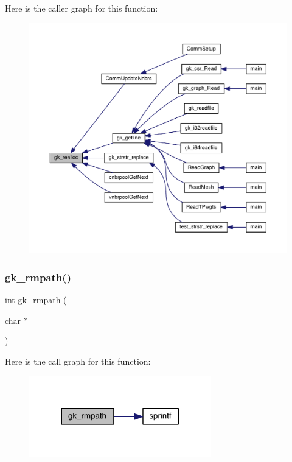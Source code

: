 Here is the caller graph for this function\+:\nopagebreak
\begin{figure}[H]
\begin{center}
\leavevmode
\includegraphics[width=350pt]{a00077_ab76a07ccd25288dd9acc99f5f24a7600_icgraph}
\end{center}
\end{figure}
\mbox{\label{a00077_a046321bd701b2bd8f1fc8619fb8e0512}} 
\subsubsection{\texorpdfstring{gk\+\_\+rmpath()}{gk\_rmpath()}}
{\footnotesize\ttfamily int gk\+\_\+rmpath (\begin{DoxyParamCaption}\item[{char $\ast$}]{ }\end{DoxyParamCaption})}

Here is the call graph for this function\+:\nopagebreak
\begin{figure}[H]
\begin{center}
\leavevmode
\includegraphics[width=224pt]{a00077_a046321bd701b2bd8f1fc8619fb8e0512_cgraph}
\end{center}
\end{figure}
\mbox{\label{a00077_a5f79542ae883d026565a71bab5bca8d4}} 
